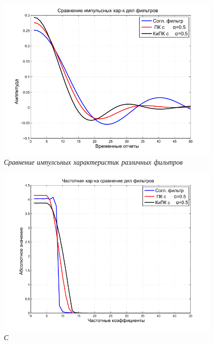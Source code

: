\begin{figure}[H]
\centering
\includegraphics[width=0.9\columnwidth]{TIME_comp.png}
\caption{\textit{Сравнение импулсьных характеристик различных фильтров}} \label{fg_5}
\end{figure}
\begin{figure}[H]
\centering
\includegraphics[width=0.9\columnwidth]{FREQ_comp.png}
\caption{\textit{С}} \label{fg_6}
\end{figure}
